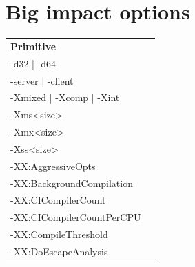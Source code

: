 \documentclass[
  digital, %
  oneside,
  notable, %
  nolof,     %
  nolot     %
]{fithesis3}
\begin{document}
\chapter{Big impact options}
\begin{table}[]
	\centering
	\begin{tabular}{ll}
	\cline{1-1}
	\multicolumn{1}{|l|}{\textbf{Primitive}}                         &                                                             \\ \cline{1-1}
	\multicolumn{1}{|l|}{-d32 | -d64}                                &                                                             \\ \cline{1-1}
	\multicolumn{1}{|l|}{-server | -client}                          &                                                             \\ \cline{1-1}
	\multicolumn{1}{|l|}{-Xmixed | -Xcomp | -Xint}                   &                                                             \\ \cline{1-1}
	\multicolumn{1}{|l|}{-Xms\textless size\textgreater}              &                                                             \\ \cline{1-1}
	\multicolumn{1}{|l|}{-Xmx\textless size\textgreater}              &                                                             \\ \cline{1-1}
	\multicolumn{1}{|l|}{-Xss\textless size\textgreater}              &                                                             \\ \cline{1-1}
	\multicolumn{1}{|l|}{-XX:AggressiveOpts}                         &                                                             \\ \cline{1-1}
	\multicolumn{1}{|l|}{-XX:BackgroundCompilation}                  &                                                             \\ \cline{1-1}
	\multicolumn{1}{|l|}{-XX:CICompilerCount}                        &                                                             \\ \cline{1-1}
	\multicolumn{1}{|l|}{-XX:CICompilerCountPerCPU}                  &                                                             \\ \cline{1-1}
	\multicolumn{1}{|l|}{-XX:CompileThreshold}                       &                                                             \\ \cline{1-1}
	\multicolumn{1}{|l|}{-XX:DoEscapeAnalysis}                       &                                                             \\ \cline{1-1}

\end{tabular}
\end{table}
\end{document}
